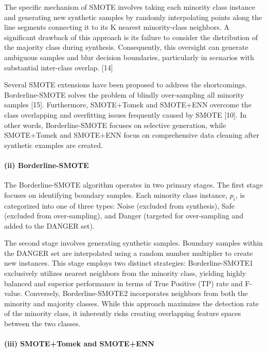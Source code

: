 \documentclass[sigconf]{acmart}
\begin{document}
The specific mechanism of SMOTE involves taking each minority class instance and generating new synthetic samples by randomly interpolating points along the line segments connecting it to its K nearest minority-class neighbors. A significant drawback of this approach is its failure to consider the distribution of the majority class during synthesis. Consequently, this oversight can generate ambiguous samples and blur decision boundaries, particularly in scenarios with substantial inter-class overlap. [14] 

Several SMOTE extensions have been proposed to address the shortcomings. Borderline-SMOTE solves the problem of blindly over-sampling all minority samples [15]. Furthermore, SMOTE+Tomek and SMOTE+ENN overcome the class overlapping and overfitting issues frequently caused by SMOTE [10]. In other words, Borderline-SMOTE focuses on selective generation, while SMOTE+Tomek and SMOTE+ENN focus on comprehensive data cleaning after synthetic examples are created.

\paragraph{(ii) Borderline-SMOTE}

The Borderline-SMOTE algorithm operates in two primary stages. The first stage focuses on identifying boundary samples. Each minority class instance, $p_i$, is categorized into one of three types: Noise (excluded from synthesis), Safe (excluded from over-sampling), and Danger (targeted for over-sampling and added to the DANGER set).  

The second stage involves generating synthetic samples. Boundary samples within the DANGER set are interpolated using a random number multiplier to create new instances. This stage employs two distinct strategies: Borderline-SMOTE1 exclusively utilizes nearest neighbors from the minority class, yielding highly balanced and superior performance in terms of True Positive (TP) rate and F-value. Conversely, Borderline-SMOTE2 incorporates neighbors from both the minority and majority classes. While this approach maximizes the detection rate of the minority class, it inherently risks creating overlapping feature spaces between the two classes. 

\paragraph{(iii) SMOTE+Tomek and SMOTE+ENN} ~\\
\end{document}
